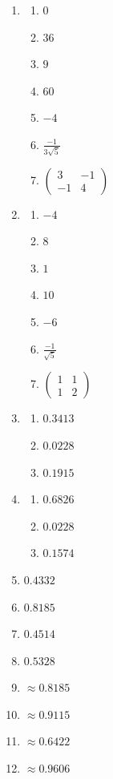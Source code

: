 \begin{enumerate}
\item
\begin{enumerate}
\item   $0 $
\item   $36$
\item  $9 $
\item   $60 $
\item  $-4$
\item   $\frac{-1}{3\sqrt{5}}$
\item  $\begin{pmatrix}
 3 & -1 \\
-1 & 4
\end{pmatrix}$
\end{enumerate}

\item
\begin{enumerate}
\item $-4$
\item $8 $
\item $1 $
\item $10 $
\item $-6$
\item$ \frac{-1}{\sqrt{5}}$

\item $\begin{pmatrix}
 1 & 1 \\
 1 & 2
\end{pmatrix}$
\end{enumerate}
\item
\begin{enumerate}
\item $0.3413$
\item $0.0228$
\item $0.1915$
\end{enumerate}

\item
\begin{enumerate}
\item $0.6826$
\item $0.0228  $
\item $0.1574  $
\end{enumerate}

\item $0.4332 $
\item $0.8185  $
\item $0.4514 $
\item $0.5328  $
\item $\approx 0.8185 $
\item $\approx 0.9115$
\item $\approx 0.6422 $
\item $\approx 0.9606$


\end{enumerate}
